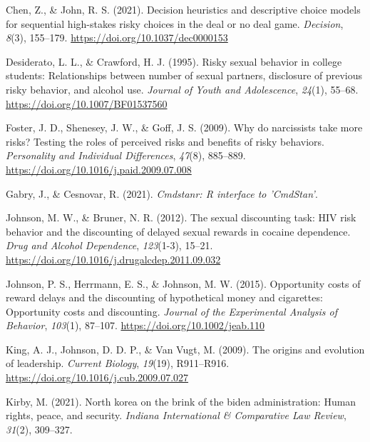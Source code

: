 \documentclass[
  donotrepeattitle,doc, 12pt, a4paper,floatsintext]{apa7}
\newlength{\cslhangindent}
\newlength{\cslentryspacingunit} %
\newenvironment{CSLReferences}[2] %
 {%
  \setlength{\parindent}{0pt}
  \ifodd #1
  \let\oldpar\par
  \def\par{\hangindent=\cslhangindent\oldpar}
  \fi
  \setlength{\parskip}{#2\cslentryspacingunit}
 }%
 {}
\begin{document}
\begin{CSLReferences}{1}{0}
\leavevmode{}%
Chen, Z., \& John, R. S. (2021). Decision heuristics and descriptive choice models for sequential high-stakes risky choices in the deal or no deal game. \emph{Decision}, \emph{8}(3), 155--179. \url{https://doi.org/10.1037/dec0000153}

\leavevmode{}%
Desiderato, L. L., \& Crawford, H. J. (1995). Risky sexual behavior in college students: Relationships between number of sexual partners, disclosure of previous risky behavior, and alcohol use. \emph{Journal of Youth and Adolescence}, \emph{24}(1), 55--68. \url{https://doi.org/10.1007/BF01537560}

\leavevmode{}%
Foster, J. D., Shenesey, J. W., \& Goff, J. S. (2009). Why do narcissists take more risks? {Testing} the roles of perceived risks and benefits of risky behaviors. \emph{Personality and Individual Differences}, \emph{47}(8), 885--889. \url{https://doi.org/10.1016/j.paid.2009.07.008}

\leavevmode{}%
Gabry, J., \& Cesnovar, R. (2021). \emph{Cmdstanr: {R} interface to '{CmdStan}'}.

\leavevmode{}%
Johnson, M. W., \& Bruner, N. R. (2012). The sexual discounting task: {HIV} risk behavior and the discounting of delayed sexual rewards in cocaine dependence. \emph{Drug and Alcohol Dependence}, \emph{123}(1-3), 15--21. \url{https://doi.org/10.1016/j.drugalcdep.2011.09.032}

\leavevmode{}%
Johnson, P. S., Herrmann, E. S., \& Johnson, M. W. (2015). Opportunity costs of reward delays and the discounting of hypothetical money and cigarettes: Opportunity costs and discounting. \emph{Journal of the Experimental Analysis of Behavior}, \emph{103}(1), 87--107. \url{https://doi.org/10.1002/jeab.110}

\leavevmode{}%
King, A. J., Johnson, D. D. P., \& Van Vugt, M. (2009). The origins and evolution of leadership. \emph{Current Biology}, \emph{19}(19), R911--R916. \url{https://doi.org/10.1016/j.cub.2009.07.027}

\leavevmode{}%
Kirby, M. (2021). North korea on the brink of the biden administration: Human rights, peace, and security. \emph{Indiana International \& Comparative Law Review}, \emph{31}(2), 309--327.


\end{CSLReferences}
\end{document}
